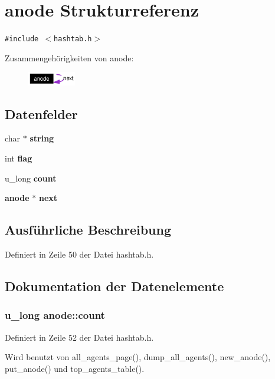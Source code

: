 \section{anode Strukturreferenz}
\label{structanode}
{\tt \#include $<$hashtab.h$>$}

Zusammengeh\"{o}rigkeiten von anode:\begin{figure}[H]
\begin{center}
\leavevmode
\includegraphics[width=59pt]{structanode__coll__graph}
\end{center}
\end{figure}
\subsection*{Datenfelder}
\begin{CompactItemize}
\item 
char $\ast$ {\bf string}
\item 
int {\bf flag}
\item 
u\_\-long {\bf count}
\item 
{\bf anode} $\ast$ {\bf next}
\end{CompactItemize}


\subsection{Ausf\"{u}hrliche Beschreibung}




Definiert in Zeile 50 der Datei hashtab.h.

\subsection{Dokumentation der Datenelemente}
\subsubsection{\setlength{\rightskip}{0pt plus 5cm}u\_\-long {\bf anode::count}}\label{structanode_358dd30d63b3ecf448451988c0139fcf}




Definiert in Zeile 52 der Datei hashtab.h.

Wird benutzt von all\_\-agents\_\-page(), dump\_\-all\_\-agents(), new\_\-anode(), put\_\-anode() und top\_\-agents\_\-table().
